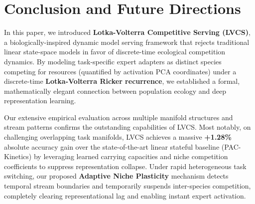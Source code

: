 \section{Conclusion and Future Directions}
\label{sec:conclusion}

In this paper, we introduced \textbf{Lotka-Volterra Competitive Serving (LVCS)}, a biologically-inspired dynamic model serving framework that rejects traditional linear state-space models in favor of discrete-time ecological competition dynamics. By modeling task-specific expert adapters as distinct species competing for resources (quantified by activation PCA coordinates) under a discrete-time \textbf{Lotka-Volterra Ricker recurrence}, we established a formal, mathematically elegant connection between population ecology and deep representation learning.

Our extensive empirical evaluation across multiple manifold structures and stream patterns confirms the outstanding capabilities of LVCS. Most notably, on challenging overlapping task manifolds, LVCS achieves a massive \textbf{+1.28\%} absolute accuracy gain over the state-of-the-art linear stateful baseline (PAC-Kinetics) by leveraging learned carrying capacities and niche competition coefficients to suppress representation collapse. Under rapid heterogeneous task switching, our proposed \textbf{Adaptive Niche Plasticity} mechanism detects temporal stream boundaries and temporarily suspends inter-species competition, completely clearing representational lag and enabling instant expert activation.

